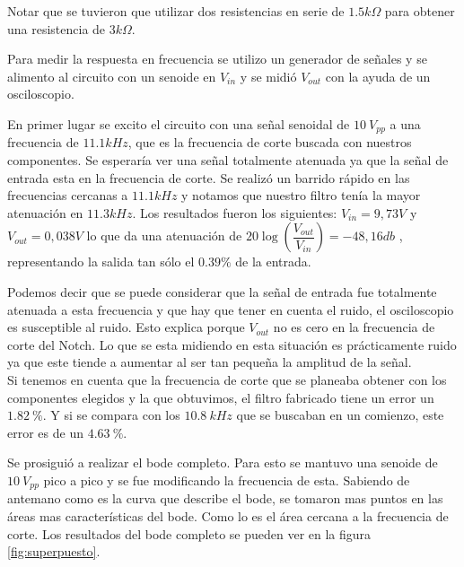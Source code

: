 \documentclass[12pt,a4paper]{article}
\begin{document}
Notar que se tuvieron que utilizar dos resistencias en serie de $1.5k\Omega$ para obtener una
resistencia de $3k\Omega$. 

Para medir la respuesta en frecuencia se utilizo un generador de señales y se alimento al circuito con un senoide en $V_{in}$ y se midió $V_{out}$ con la ayuda de un osciloscopio.

En primer lugar se excito el circuito con una señal senoidal de $10 \ V_{pp}$ a una frecuencia de $11.1kHz$, que es la frecuencia de corte buscada con nuestros componentes. Se esperaría ver una señal totalmente atenuada ya que la señal de entrada esta en la frecuencia de corte. Se realizó un barrido rápido en las frecuencias cercanas a $11.1kHz$ y notamos que nuestro filtro tenía la mayor atenuación en $11.3kHz$. Los resultados fueron los siguientes: $V_{in}=9,73V$ y $V_{out}= 0,038V$ lo que da una atenuación de $20\log(\dfrac{V_{out}}{V_{in}}) = -48,16db$ , representando la salida tan sólo el $0.39 \%$ de la entrada. 

Podemos decir que se puede considerar que la señal de entrada fue totalmente atenuada a esta frecuencia y que
hay que tener en cuenta el ruido, el 
osciloscopio es susceptible al ruido. Esto explica porque $V_{out}$ no es cero en la frecuencia de corte del Notch. Lo que se esta midiendo en esta situación es prácticamente ruido ya que este tiende a aumentar al ser tan pequeña la amplitud de la señal. \\

Si tenemos en cuenta que la frecuencia de corte que se planeaba obtener con los componentes elegidos y la que obtuvimos, el filtro fabricado tiene un error un $1.82 \ \%$. Y si se compara con los $10.8 \ kHz$ que se buscaban en un comienzo, este error es de un $4.63 \ \%$.

Se prosiguió a realizar el bode completo. Para esto se mantuvo una senoide de $10 \ V_{pp}$ pico a pico
y se fue modificando la frecuencia de esta. Sabiendo de antemano como es la curva que 
describe el bode, se tomaron mas puntos en las áreas mas características del bode. Como lo es el área cercana a la frecuencia de corte. Los resultados del bode completo se pueden ver en la figura \ref{fig:superpuesto}.
\end{document}
